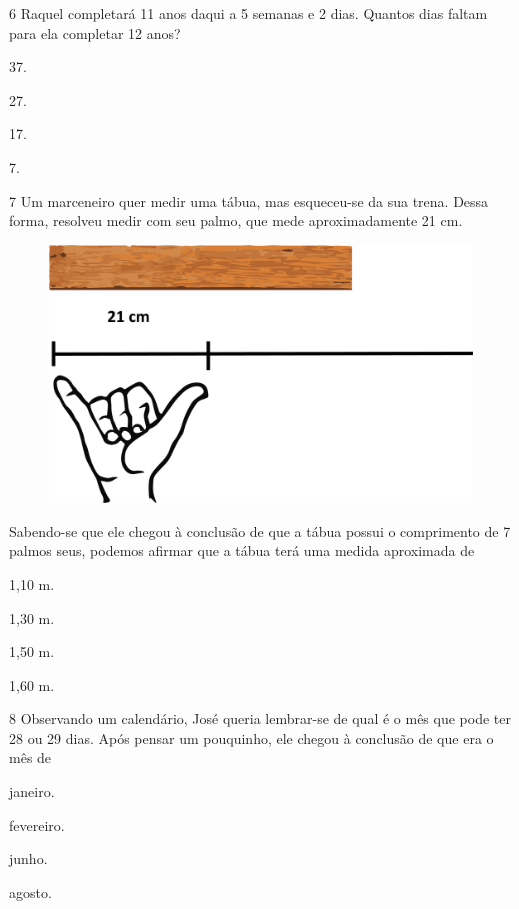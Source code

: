 \num{6} Raquel completará 11 anos daqui a 5 semanas e 2 dias. Quantos dias faltam para ela completar 12 anos?

\begin{multicols}{2}
\begin{escolha}
\item
  37.
\item
  27.
\item
  17.
\item
  7.
\end{escolha}
\end{multicols}

\num{7} Um marceneiro quer medir uma tábua, mas esqueceu-se da sua trena. Dessa forma, resolveu medir com seu palmo, que mede aproximadamente 21 cm.

\begin{figure}[htpb!]
\centering
\includegraphics[width=.5\textwidth]{./media/image104.png}
\end{figure}

Sabendo-se que ele chegou à conclusão de que a tábua possui o comprimento de 7 palmos seus, podemos afirmar que a tábua terá uma medida aproximada de

\begin{multicols}{2}
\begin{escolha}
\item
  1,10 m.
\item
  1,30 m.
\item
  1,50 m.
\item
  1,60 m.
\end{escolha}
\end{multicols}

\num{8} Observando um calendário, José queria lembrar-se de qual é o mês que pode ter 28 ou 29 dias. Após pensar um pouquinho, ele chegou à conclusão de que era o mês de

\begin{escolha}
\item
  janeiro.
\item
  fevereiro.
\item
  junho.
\item
  agosto.
\end{escolha}


